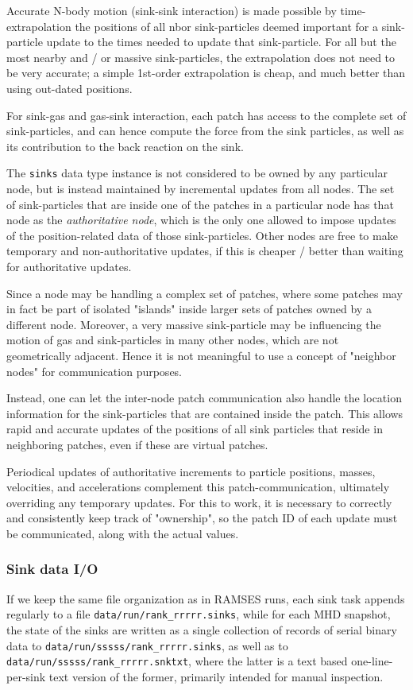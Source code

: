 \documentclass[paper=a4,fontsize=11pt]{scrartcl}
\numberwithin{equation}{section}		%
\numberwithin{figure}{section}			%
\numberwithin{table}{section}				%
\newcommand{\codecolor}{\color{Blue}}
\newcommand{\Code}[1]{{\codecolor\texttt{#1}}}
\begin{document}
Accurate N-body motion (sink-sink interaction) is made possible by time-extrapolation the positions of all nbor sink-particles deemed important for a sink-particle update to the times needed to update that sink-particle.  For all but the most nearby and / or massive sink-particles, the extrapolation does not need to be very accurate; a simple 1st-order extrapolation is cheap, and much better than using out-dated positions.

For sink-gas and gas-sink interaction, each patch has access to the complete set of sink-particles, and can hence compute the force from the sink particles, as well as its contribution to the back reaction on the sink.

The \Code{sinks} data type instance is not considered to be owned by any particular node, but is instead maintained by incremental updates from all nodes.  The set of sink-particles that are inside one of the patches in a particular node has that node as the \textit{authoritative node}, which is the only one allowed to impose updates of the position-related data of those sink-particles.  Other nodes are free to make temporary and non-authoritative updates, if this is cheaper / better than waiting for authoritative updates.

Since a node may be handling a complex set of patches, where some patches may in fact be part of isolated "islands" inside larger sets of patches owned by a different node.  Moreover, a very massive sink-particle may be influencing the motion of gas and sink-particles in many other nodes, which are not geometrically adjacent.  Hence it is not meaningful to use a concept of "neighbor nodes" for communication purposes.

Instead, one can let the inter-node patch communication also handle the location information for the sink-particles that are contained inside the patch.  This allows rapid and accurate updates of the positions of all sink particles that reside in neighboring patches, even if these are virtual patches.

Periodical updates of authoritative increments to particle positions, masses, velocities, and accelerations complement this patch-communication, ultimately overriding any temporary updates.   For this to work, it is necessary to correctly and consistently keep track of "ownership", so the patch ID of each update must be communicated, along with the actual values.

\subsubsection{Sink data I/O}
If we keep the same file organization as in RAMSES runs, each sink task appends regularly to a file \Code{data/run/rank\_rrrrr.sinks}, while for each MHD snapshot, the state of the sinks are written as a single collection of records of serial binary data to \Code{data/run/sssss/rank\_rrrrr.sinks}, as well as to \Code{data/run/sssss/rank\_rrrrr.snktxt}, where the latter is a text based one-line-per-sink text version of the former, primarily intended for manual inspection.
\end{document}
